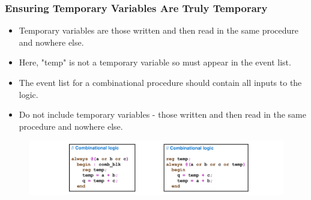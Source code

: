 \documentclass[t, notes, xcolor=table]{beamer}
\begin{document}
\begin{frame}
\frametitle{Ensuring Temporary Variables Are Truly Temporary}

\scriptsize{
\begin{multicols}{2}
\begin{itemize}
\item Temporary variables are those written and then read in the same procedure and nowhere else.
\item Here, "temp" is not a temporary variable so must appear in the event list.
\end{itemize}
\vfill
\columnbreak
\begin{itemize}
\item The event list for a combinational procedure should contain all inputs to the logic.
\item Do not include temporary variables - those written
and then read in the same procedure and nowhere else.
\end{itemize}
\end{multicols}
\begin{figure}
    \includegraphics[width=1\textwidth]{img/15_temp.png}
\end{figure}
}

\end{frame}
\end{document}
